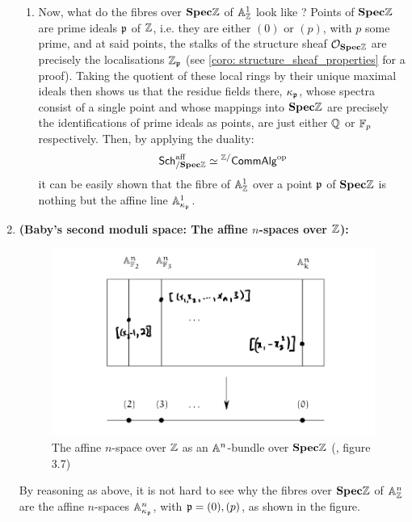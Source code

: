 \begin{example}
\begin{enumerate}
\begin{enumerate}
                                \item Now, what do the fibres over $\mathbf{Spec} \mathbb{Z}$ of $\mathbb{A}^1_{\mathbb{Z}}$ look like ? Points of $\mathbf{Spec} \mathbb{Z}$ are prime ideals $\mathfrak{p}$ of $\mathbb{Z}$, i.e. they are either $(0)$ or $(p)$, with $p$ some prime, and at said points, the stalks of the structure sheaf $\mathcal{O}_{\mathbf{Spec} \mathbb{Z}}$ are precisely the localisations $\mathbb{Z}_{\mathfrak{p}}$ (see \ref{coro: structure_sheaf_properties} for a proof). Taking the quotient of these local rings by their unique maximal ideals then shows us that the residue fields there, $\kappa_{\mathfrak{p}}$, whose spectra consist of a single point and whose mappings into $\mathbf{Spec} \mathbb{Z}$ are precisely the identifications of prime ideals as points, are just either $\mathbb{Q}$ or $\mathbb{F}_p$ respectively. Then, by applying the duality:
                                    $$\mathsf{Sch}^{\mathrm{aff}}_{/\mathbf{Spec} \mathbb{Z}} \simeq {}^{\mathbb{Z}/}\mathsf{Comm}\mathsf{Alg}^{\mathrm{op}}$$
                                it can be easily shown that the fibre of $\mathbb{A}^1_{\mathbb{Z}}$ over a point $\mathfrak{p}$ of $\mathbf{Spec} \mathbb{Z}$ is nothing but the affine line $\mathbb{A}^1_{\kappa_{\mathfrak{p}}}$. 
                            \end{enumerate}
                        \item \textbf{(Baby's second moduli space: The affine $n$-spaces over $\mathbb{Z}$):}
                            \begin{figure}[H]
                                \centering
                                \includegraphics[width=\linewidth,height=\textheight,keepaspectratio]{Figures/affine n-space over Z.png}
                                \caption{The affine $n$-space over $\mathbb{Z}$ as an $\mathbb{A}^n$-bundle over $\mathbf{Spec} \mathbb{Z}$ (\cite{risingsea}, figure 3.7)}
                                \label{fig: affine_n_space_over_Z}
                            \end{figure} 
                        \noindent
                        By reasoning as above, it is not hard to see why the fibres over $\mathbf{Spec} \mathbb{Z}$ of $\mathbb{A}^n_{\mathbb{Z}}$ are the affine $n$-spaces $\mathbb{A}^n_{\kappa_{\mathfrak{p}}}$, with $\mathfrak{p} = (0), (p)$, as shown in the figure.
                    \end{enumerate}
                \end{example}
            
